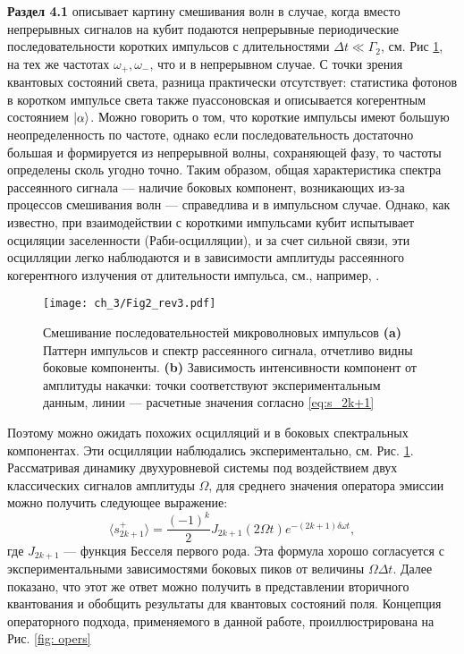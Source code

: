 \textbf{Раздел 4.1} описывает картину смешивания волн в случае, когда вместо непрерывных сигналов на кубит подаются непрерывные периодические последовательности коротких импульсов с длительностями $\Delta t \ll \Gamma_2$, см. Рис \ref{fig: bessel}, на тех же частотах $\omega_+, \omega_-$, что и в непрерывном случае. С точки зрения квантовых состояний света, разница практически отсутствует: статистика фотонов в коротком импульсе света также пуассоновская и описывается когерентным состоянием $\ket{\alpha}$. Можно говорить о том, что короткие импульсы имеют большую неопределенность по частоте, однако если последовательность достаточно большая и формируется из непрерывной волны, сохраняющей фазу, то частоты определены сколь угодно точно. Таким образом, общая характеристика спектра рассеянного сигнала --- наличие боковых компонент, возникающих из-за процессов смешивания волн --- справедлива и в импульсном случае. Однако, как известно, при взаимодействии с короткими импульсами кубит испытывает осциляции заселенности (Раби-осцилляции), и за счет сильной связи, эти осцилляции легко наблюдаются и в зависимости амплитуды рассеянного когерентного излучения от длительности импульса, см., например, \cite{abdumalikov2011dynamics}.
\begin{figure}[htb]\center
	\texttt{[image: ch\_3/Fig2\_rev3.pdf]}	
	\caption{Смешивание последовательностей микроволновых импульсов  \textbf{(a)} Паттерн импульсов и спектр рассеянного сигнала, отчетливо видны боковые компоненты. \textbf{(b)} Зависимость интенсивности компонент от амплитуды накачки: точки соответствуют экспериментальным данным, линии --- расчетные значения согласно \eqref{eq:s_2k+1}}
	\label{fig: bessel}
\end{figure}
Поэтому можно ожидать похожих осцилляций и в боковых спектральных компонентах. Эти осцилляции наблюдались экспериментально, см. Рис. \ref{fig: bessel}. Рассматривая динамику двухуровневой системы под воздействием двух классических сигналов амплитуды $\Omega$, для среднего значения оператора эмиссии можно получить следующее выражение: 
\begin{equation}
\langle s^+_{2k+1}\rangle = \frac{(-1)^k}{2}J_{2k+1}(2\Omega t)e^{-(2k+1)\delta\omega t}, 
\label{eq:s_2k+1}
\end{equation}
где $J_{2k+1}$ --- функция Бесселя первого рода. Эта формула хорошо согласуется с экспериментальными зависимостями боковых пиков от величины $\Omega\Delta t$. Далее показано, что этот же ответ можно получить в представлении вторичного квантования и обобщить результаты для квантовых состояний поля. Концепция операторного подхода, применяемого в данной работе, проиллюстрирована на Рис. \ref{fig: opers}
